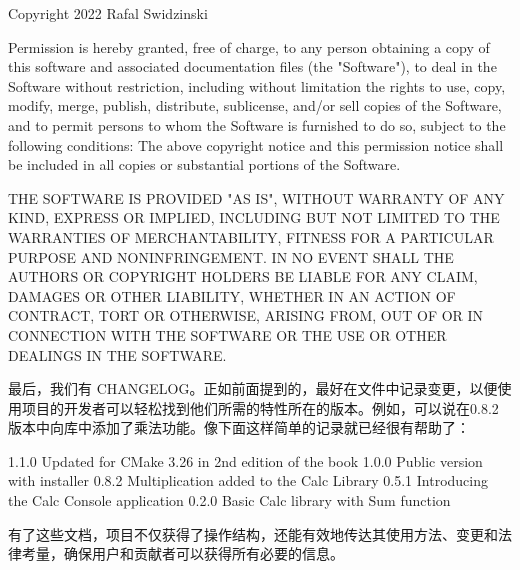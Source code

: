 \begin{shell}
Copyright 2022 Rafal Swidzinski

Permission is hereby granted, free of charge, to any person obtaining a
copy of this software and associated documentation files (the "Software"),
to deal in the Software without restriction, including without limitation
the rights to use, copy, modify, merge, publish, distribute, sublicense,
and/or sell copies of the Software, and to permit persons to whom the
Software is furnished to do so, subject to the following conditions:
The above copyright notice and this permission notice shall be included in
all copies or substantial portions of the Software.

THE SOFTWARE IS PROVIDED "AS IS", WITHOUT WARRANTY OF ANY KIND, EXPRESS OR
IMPLIED, INCLUDING BUT NOT LIMITED TO THE WARRANTIES OF MERCHANTABILITY,
FITNESS FOR A PARTICULAR PURPOSE AND NONINFRINGEMENT. IN NO EVENT SHALL
THE AUTHORS OR COPYRIGHT HOLDERS BE LIABLE FOR ANY CLAIM, DAMAGES OR OTHER
LIABILITY, WHETHER IN AN ACTION OF CONTRACT, TORT OR OTHERWISE, ARISING
FROM, OUT OF OR IN CONNECTION WITH THE SOFTWARE OR THE USE OR OTHER
DEALINGS IN THE SOFTWARE.
\end{shell}

最后，我们有 CHANGELOG。正如前面提到的，最好在文件中记录变更，以便使用项目的开发者可以轻松找到他们所需的特性所在的版本。例如，可以说在0.8.2版本中向库中添加了乘法功能。像下面这样简单的记录就已经很有帮助了：


\begin{shell}
1.1.0 Updated for CMake 3.26 in 2nd edition of the book
1.0.0 Public version with installer
0.8.2 Multiplication added to the Calc Library
0.5.1 Introducing the Calc Console application
0.2.0 Basic Calc library with Sum function
\end{shell}

有了这些文档，项目不仅获得了操作结构，还能有效地传达其使用方法、变更和法律考量，确保用户和贡献者可以获得所有必要的信息。







































